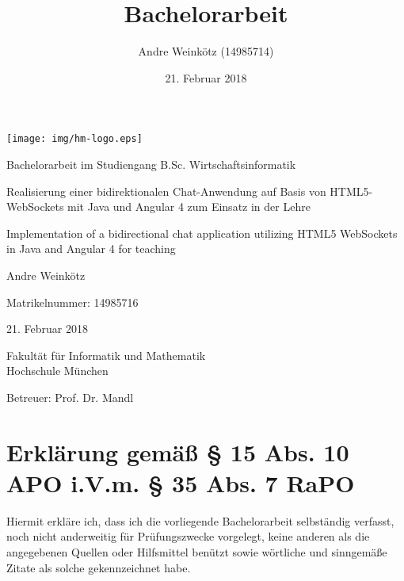 \documentclass[11pt,a4paper,titlepage]{scrartcl}
\title{Bachelorarbeit}
\author{Andre Weinkötz (14985714)}
\date{21. Februar 2018}
\numberwithin{equation}{section}
\begin{document}
  \pagestyle{empty}
  \renewcommand{\thelstlisting}{\arabic{section}.\arabic{lstlisting}}
\begin{titlepage}

\begin{center}
	\texttt{[image: img/hm-logo.eps]}
\end{center}
 \bigskip

 \begin{center} \large 
    
    Bachelorarbeit im Studiengang B.Sc. Wirtschaftsinformatik
    \vspace*{2cm}
\end{center}
\begin{doublespace}
	{\huge Realisierung einer bidirektionalen Chat-Anwendung auf Basis von HTML5-WebSockets mit Java und Angular 4 zum Einsatz in der Lehre}\\
\vspace{1.5cm}

	{\huge \noindent Implementation of a bidirectional chat application utilizing HTML5 WebSockets in Java and Angular 4 for teaching}
\end{doublespace}

    
    \vspace*{2.0cm}
 \begin{center}
    Andre Weinkötz \bigskip
    
    
    Matrikelnummer: 14985716 \bigskip


    21. Februar 2018
    \vspace*{1.5cm}
    
    

    Fakultät für Informatik und Mathematik \\
	Hochschule München\bigskip
	
	Betreuer: Prof. Dr. Mandl 
	
	
  \end{center}
\end{titlepage}
\newpage
\section*{Erklärung gemäß § 15 Abs. 10 APO i.V.m. § 35 Abs. 7 RaPO}
Hiermit erkläre ich, dass ich die vorliegende Bachelorarbeit selbständig verfasst, noch nicht anderweitig für Prüfungszwecke vorgelegt, keine anderen als die angegebenen Quellen oder Hilfsmittel benützt sowie wörtliche und sinngemäße Zitate als solche gekennzeichnet habe.
\vspace*{3cm}
\end{document}
